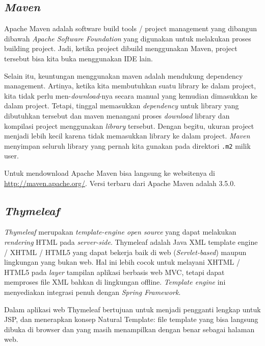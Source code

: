 
\subsection{\textit{Maven}}
\cite{MengenalMaven2015EGunawan}
Apache Maven adalah software build tools / project management yang dibangun dibawah \textit{Apache Software Foundation} yang digunakan untuk melakukan proses building project. Jadi, ketika project dibuild menggunakan Maven, project tersebut bisa kita buka menggunakan IDE lain.

Selain itu, keuntungan menggunakan maven adalah mendukung dependency management. Artinya, ketika kita membutuhkan suatu library ke dalam project, kita tidak perlu men-\textit{download}-nya secara manual yang kemudian dimasukkan ke dalam project. Tetapi, tinggal memasukkan \textit{dependency} untuk library yang dibutuhkan tersebut dan maven menangani proses \textit{download} library dan kompilasi project menggunakan \textit{library} tersebut.  Dengan begitu, ukuran project menjadi lebih kecil karena tidak memasukkan library ke dalam project. \textit{Maven} menyimpan seluruh library yang pernah kita gunakan pada direktori \texttt{.m2} milik user.

Untuk mendownload Apache Maven bisa langsung ke websitenya di \url{http://maven.apache.org/}. Versi terbaru dari Apache Maven adalah 3.5.0.

\subsection{\textit{Thymeleaf}}
\cite{CogoluegnesIntroducing:2013} 
\textit{Thymeleaf} merupakan \textit{template-engine open source} yang dapat melakukan \textit{rendering} HTML pada \textit{server-side}. Thymeleaf adalah Java XML template engine / XHTML / HTML5 yang dapat bekerja baik di web (\textit{Servlet-based}) maupun lingkungan yang bukan web. Hal ini lebih cocok untuk melayani XHTML / HTML5 pada \textit{layer} tampilan aplikasi berbasis web MVC, tetapi dapat memproses file XML bahkan di lingkungan offline. \textit{Template engine} ini menyediakan integrasi penuh dengan \textit{Spring Framework}. 

Dalam aplikasi web Thymeleaf bertujuan untuk menjadi pengganti lengkap untuk JSP, dan menerapkan konsep Natural Template: file template yang bisa langsung dibuka di browser dan yang masih menampilkan dengan benar sebagai halaman web.

